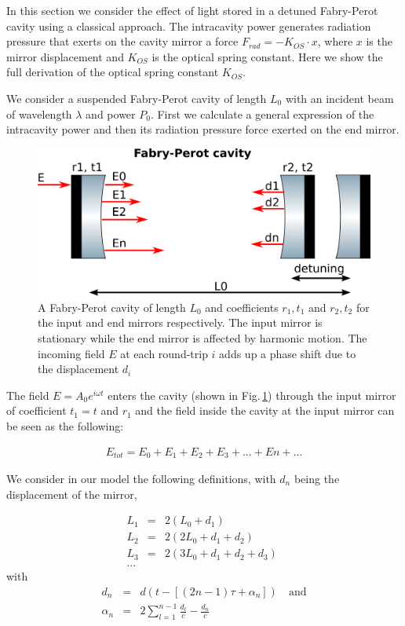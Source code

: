 In this section we consider the effect of light stored in a detuned Fabry-Perot cavity using a classical approach.
The intracavity power generates radiation pressure that exerts on the cavity mirror a force $F_{rad}=-K_{OS}\cdot x$,
where $x$ is the mirror displacement and $K_{OS}$ is the optical spring constant.
Here we show the full derivation of the optical spring constant $K_{OS}$.

We consider a suspended Fabry-Perot cavity of length $L_0$ %
with an incident beam of wavelength $\lambda$ and power $P_0$.
First we calculate a general expression of the intracavity power and then its  radiation pressure force exerted on the end mirror.\\


\begin{figure}[htbp]
	\centering
		\includegraphics[width=.7\textwidth]{figures/theory/cavity_paper.pdf}
	\caption[A Fabry-Perot cavity]{A Fabry-Perot cavity of length $L_0$ and coefficients $r_1,t_1$ and $r_2,t_2$ for the input and end mirrors respectively. 
	The input mirror is stationary while the end mirror is affected by harmonic motion. The incoming field $E$ at each round-trip $i$ adds up a phase shift due to the displacement $d_i$}
	\label{fig:cavity_k}
\end{figure}


The field $E=A_0e^{i\omega t}$ enters the cavity (shown in Fig.\,\ref{fig:cavity_k}) through the input mirror of coefficient $t_1=t$ and $r_1$ and the field inside the cavity at the input mirror can be seen as the following:

\begin{align}
E_{tot}=E_0+E_1+E_2+E_3+...+En+...
\end{align}


We consider in our model the following definitions, with $d_n$ being the displacement of the mirror,

\begin{align}
L_1&=&2(L_0+d_1)\\
L_2&=&2(2L_0+d_1+d_2)\nonumber\\
L_3&=&2(3L_0+d_1+d_2+d_3)\,\, \nonumber\\ %
...\nonumber
\end{align}
with 
\begin{align}
\label{eqn:dn1}
d_n &=& d(t-[(2n-1)\tau + \alpha_n ]) \quad \mbox{and}\\
\label{eqn:dn2}
\alpha_n &=& 2\sum\limits_{l=1}^{n-1}\frac{d_l}{c}-\frac{d_n}{c}
\end{align}

